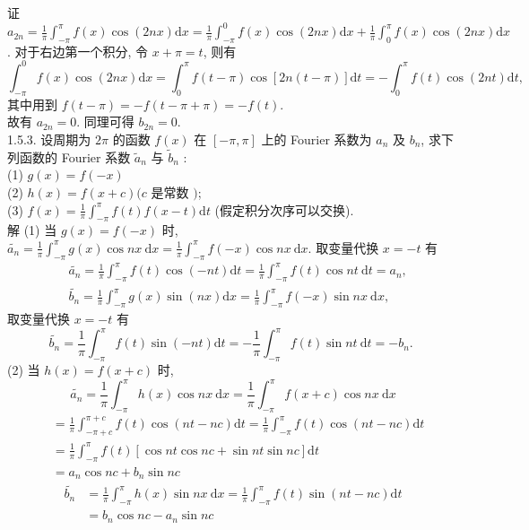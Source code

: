 \documentclass[a4paper,11pt,UTF8]{article}
\begin{document}
证 $\displaystyle a_{2 n}=\frac{1}{\pi} \int_{-\pi}^\pi f(x) \cos (2 n x) \mathrm{d} x=\frac{1}{\pi} \int_{-\pi}^0 f(x) \cos (2 n x) \mathrm{d} x+\frac{1}{\pi} \int_0^\pi f(x) \cos (2 n x) \mathrm{d} x$.
对于右边第一个积分, 令 $x+\pi=t$, 则有
$$
\int_{-\pi}^0 f(x) \cos (2 n x) \mathrm{d} x=\int_0^\pi f(t-\pi) \cos [2 n(t-\pi)] \mathrm{d} t=-\int_0^\pi f(t) \cos (2 n t) \mathrm{d} t,
$$
其中用到 $\displaystyle f(t-\pi)=-f(t-\pi+\pi)=-f(t)$.\\
故有 $a_{2 n}=0$. 同理可得 $b_{2 n}=0$.\\
1.5.3. 设周期为 $2 \pi$ 的函数 $\displaystyle f(x)$ 在 $[-\pi, \pi]$ 上的 Fourier 系数为 $a_n$ 及 $b_n$, 求下列函数的 Fourier 系数 $\displaystyle \tilde{a}_n$ 与 $\displaystyle \tilde{b}_n$ :\\
(1) $g(x)=f(-x)$\\
(2) $h(x)=f(x+c)(c$ 是常数 $)$;\\
(3) $\displaystyle f(x)=\frac{1}{\pi} \int_{-\pi}^\pi f(t) f(x-t) \mathrm{d} t$ (假定积分次序可以交换).\\
解 (1) 当 $g(x)=f(-x)$ 时,
$\displaystyle \widetilde{a_n}=\frac{1}{\pi} \int_{-\pi}^\pi g(x) \cos n x \mathrm{~d} x=\frac{1}{\pi} \int_{-\pi}^\pi f(-x) \cos n x \mathrm{~d} x$.
取变量代换 $x=-t$ 有
$$
\begin{aligned}
	& \widetilde{a_n}=\frac{1}{\pi} \int_{-\pi}^\pi f(t) \cos (-n t) \mathrm{d} t=\frac{1}{\pi} \int_{-\pi}^\pi f(t) \cos n t \mathrm{~d} t=a_n, \\
	& \tilde{b_n}=\frac{1}{\pi} \int_{-\pi}^\pi g(x) \sin (n x) \mathrm{d} x=\frac{1}{\pi} \int_{-\pi}^\pi f(-x) \sin n x \mathrm{~d} x,
\end{aligned}
$$
取变量代换 $x=-t$ 有
$$
\tilde{b_n}=\frac{1}{\pi} \int_{-\pi}^\pi f(t) \sin (-n t) \mathrm{d} t=-\frac{1}{\pi} \int_{-\pi}^\pi f(t) \sin n t \mathrm{~d} t=-b_n \text {. }
$$
(2) 当 $h(x)=f(x+c)$ 时,
$$
\widetilde{a_n}=\frac{1}{\pi} \int_{-\pi}^\pi h(x) \cos n x \mathrm{~d} x=\frac{1}{\pi} \int_{-\pi}^\pi f(x+c) \cos n x \mathrm{~d} x
$$
$$
\begin{aligned}
	& =\frac{1}{\pi} \int_{-\pi+c}^{\pi+c} f(t) \cos (n t-n c) \mathrm{d} t=\frac{1}{\pi} \int_{-\pi}^\pi f(t) \cos (n t-n c) \mathrm{d} t \\
	& =\frac{1}{\pi} \int_{-\pi}^\pi f(t)[\cos n t \cos n c+\sin n t \sin n c] \mathrm{d} t \\
	& =a_n \cos n c+b_n \sin n c
\end{aligned}
$$
$$
\begin{aligned}
	\tilde{b_n} & =\frac{1}{\pi} \int_{-\pi}^\pi h(x) \sin n x \mathrm{~d} x=\frac{1}{\pi} \int_{-\pi}^\pi f(t) \sin (n t-n c) \mathrm{d} t \\
	& =b_n \cos n c-a_n \sin n c
\end{aligned}
$$
\end{document}
